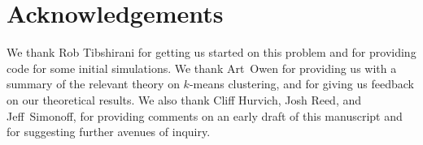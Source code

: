 \documentclass[12pt]{article}
\begin{document}


\section*{Acknowledgements}

We thank Rob Tibshirani for getting us started on this problem and
for providing code for some initial simulations. We thank Art~Owen for
providing us with a summary of the relevant theory on $k$-means clustering,
and for giving us feedback on our theoretical results.  We also thank Cliff
Hurvich, Josh Reed, and Jeff~Simonoff, for providing comments on an early
draft of this manuscript and for suggesting further avenues of inquiry.


\appendix
\end{document}
